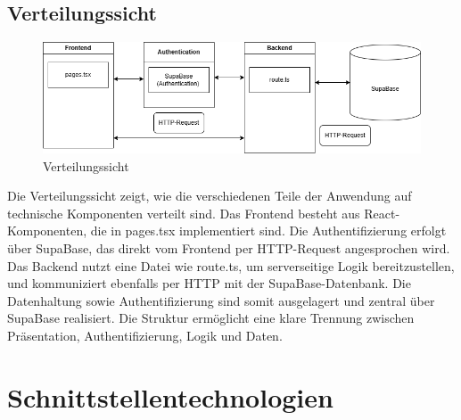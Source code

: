 \documentclass[a4paper,12pt]{article}
\begin{document}
\subsection{Verteilungssicht}
\begin{figure}[H]
  \centering
  \includegraphics[width=1\textwidth]{Abbildungen/verteilungssicht.png}
  \caption{Verteilungssicht}
  \label{fig:verteilungssicht}
\end{figure}
Die Verteilungssicht zeigt, wie die verschiedenen Teile der Anwendung auf technische Komponenten verteilt sind. Das Frontend besteht aus React-Komponenten, die in pages.tsx implementiert sind. Die Authentifizierung erfolgt über SupaBase, das direkt vom Frontend per HTTP-Request angesprochen wird. Das Backend nutzt eine Datei wie route.ts, um serverseitige Logik bereitzustellen, und kommuniziert ebenfalls per HTTP mit der SupaBase-Datenbank. Die Datenhaltung sowie Authentifizierung sind somit ausgelagert und zentral über SupaBase realisiert. Die Struktur ermöglicht eine klare Trennung zwischen Präsentation, Authentifizierung, Logik und Daten.
\newpage
\section{Schnittstellentechnologien}
\end{document}
